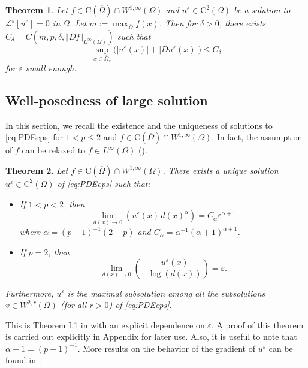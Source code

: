 \documentclass[12pt,reqno]{amsart}
\numberwithin{figure}{section}
\theoremstyle{plain}
\newtheorem{thm}{Theorem}[section]
\theoremstyle{remark}
\numberwithin{equation}{section}
\newcommand{\rmC}{\mathrm{C}}
\begin{document}
\begin{thm}\label{thm:grad_1} Let $f\in \rmC(\overline{\Omega})\cap W^{1,\infty}(\Omega)$ and $u^\varepsilon \in \mathrm{C}^2(\Omega)$ be a solution to $\mathcal{L}^\varepsilon[u^\varepsilon] = 0$ in $\Omega$. Let $m:= \max_{\overline{\Omega}}f(x)$. Then for $\delta>0$, there exists $C_\delta = C(m,p,\delta, \Vert D f\Vert_{L^\infty(\Omega)})$ such that 
\begin{equation*}
    \sup_{x\in \overline{\Omega}_\delta} \Big(|u^\varepsilon(x)|+|Du^\varepsilon(x)|\Big) \leq C_\delta
\end{equation*}
for $\varepsilon$ small enough.
\end{thm}





\subsection{Well-posedness of large solution} In this section, we recall the existence and the uniqueness of solutions to \eqref{eq:PDEeps} for $1<p\leq 2$ and $f\in \mathrm{C}(\overline{\Omega})\cap W^{1,\infty}(\Omega)$. In fact, the assumption of $f$ can be relaxed to $f\in L^\infty(\Omega)$ (\cite{Lasry1989}).

\begin{thm}\label{thm:wellposed1<p<2} Let $f\in \mathrm{C}(\overline{\Omega})\cap W^{1,\infty}(\Omega)$. There exists a unique solution $u^\varepsilon\in \mathrm{C}^2(\Omega)$ of \eqref{eq:PDEeps} such that:
\begin{itemize}
    \item[(i)] If $1<p< 2$, then 
\begin{equation}\label{rate_p<2}
    \lim_{d(x)\to 0}\left( u^\varepsilon(x) \,d(x)^\alpha \right)= C_\alpha \varepsilon^{\alpha+1}
\end{equation}
where $\alpha = (p-1)^{-1}(2-p)$ and $C_\alpha = \alpha^{-1}(\alpha+1)^{\alpha+1}$.
\item[(ii)] If $p=2$, then
\begin{equation}\label{rate_p=2}
    \lim_{d(x)\to 0} \left(-\frac{u^\varepsilon(x)}{\log(d(x))}\right) = \varepsilon.
\end{equation}
\end{itemize}
Furthermore, $u^\varepsilon$ is the maximal subsolution among all the subsolutions $v\in W^{2,r}(\Omega)$ (for all $r>0$) of \eqref{eq:PDEeps}.
\end{thm}
\noindent This is Theorem I.1 in \cite{Lasry1989} with an explicit dependence on $\varepsilon$. A proof of this theorem is carried out explicitly in Appendix for later use. Also, it is useful to note that $\alpha+1 = (p-1)^{-1}$. More results on the behavior of the gradient of $u^\varepsilon$ can be found in \cite{alessio_asymptotic_2006}.  
\end{document}
